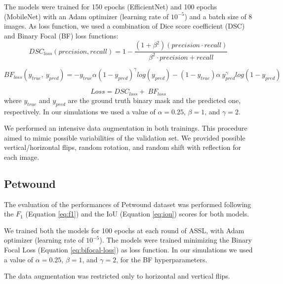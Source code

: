 \documentclass[../main.tex]{subfiles}
\begin{document}
The models were trained for 150 epochs (EfficientNet) and 100 epochs (MobileNet) with an Adam optimizer (learning rate of $10^{-5}$) and a batch size of 8 images. 
As loss function, we used a combination of Dice score coefficient (DSC) and Binary Focal (BF) loss functions:
\begin{equation}\label{eq:dsc-loss}
    DSC_{loss}\left(precision,recall\right)=1-\frac{\left(1+\beta^2\right)\left(precision\cdot recall\right)}{\beta^2\cdot precision+recall}
\end{equation}



\begin{equation}\label{eq:bifocal-loss}
    BF_{loss}\left(y_{true},\ y_{pred}\right)=-y_{true}\alpha\left(1-y_{pred}\right)^\gamma log{\left(y_{pred}\right)}-\left(1-y_{true}\right)\alpha\ y_{pred}^\gamma log\left(1-y_{pred}\right)
\end{equation}

\begin{equation}\label{eq:total-loss}
   Loss=DSC_{loss}+\ BF_{loss}
\end{equation}
where $y_{true}$ and $y_{pred}$ are the ground truth binary mask and the predicted one, respectively.
In our simulations we used a value of $\alpha=0.25$, $\beta=1$, and $\gamma=2$.


We performed an intensive data augmentation in both trainings.
This procedure aimed to mimic possible variabilities of the validation set. 
We provided possible vertical/horizontal flips, random rotation, and random shift with reflection for each image.


\subsection{Petwound}

The evaluation of the performances of Petwound dataset was performed following the $F_{1}$ (Equation \ref{eq:f1}) and the IoU (Equation \ref{eq:iou}) scores for both models. 

We trained both the models for 100 epochs at each round of ASSL, with Adam optimizer (learning rate of $10^{-5}$). The models were trained minimizing the Binary Focal Loss (Equation \ref{eq:bifocal-loss}) as loss function.
In our simulations we used a value of $\alpha=0.25$, $\beta=1$, and $\gamma=2$, for the BF hyperparameters.

The data augmentation was restricted only to horizontal and vertical flips.
\end{document}
